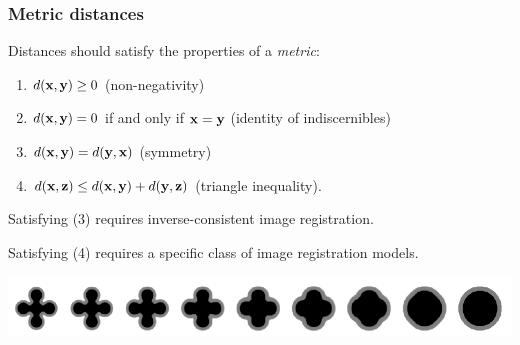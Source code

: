 

\begin{frame}
\frametitle{Metric distances}
Distances should satisfy the properties of a \emph{metric}:
\begin{enumerate}
\item $d({\bf x}, {\bf y}) \ge 0$ (non-negativity)
\item $d({\bf x}, {\bf y}) = 0$ if and only if ${\bf x} = {\bf y}$ (identity of indiscernibles)
\item $d({\bf x}, {\bf y}) = d({\bf y}, {\bf x})$ (symmetry)
\item $d({\bf x}, {\bf z}) \le d({\bf x}, {\bf y}) + d({\bf y}, {\bf z})$ (triangle inequality).
\end{enumerate}

Satisfying (3) requires inverse-consistent image registration.

Satisfying (4) requires a specific class of image registration models.

\includegraphics[width=\textwidth]{series2}\par
\end{frame}

